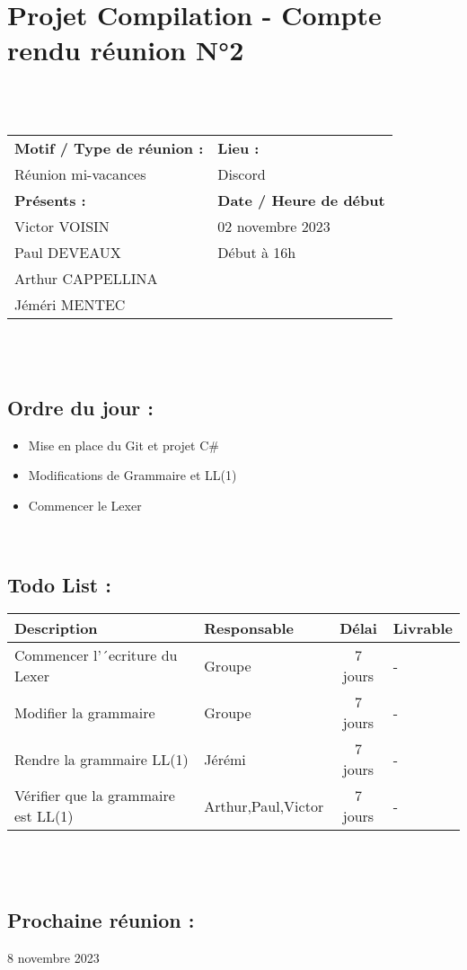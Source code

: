 \documentclass{article}
\begin{document}
\section*{Projet Compilation - Compte rendu réunion N°2}
~\\\\
\begin{tabular}{|p{7cm}|p{6cm}|}
    \hline
    \textbf{Motif / Type de réunion :}
    & \textbf{Lieu :}
    \\
    Réunion mi-vacances
    &
    Discord
    \\ \hline
    \textbf{Présents :}
    &
    \textbf{Date / Heure de début}
    \\
    Victor VOISIN &  02 novembre 2023\\
    Paul DEVEAUX & Début à 16h\\
    Arthur CAPPELLINA & \\
    Jéméri MENTEC &
    \\ \hline
\end{tabular}
\\\\

\subsection*{Ordre du jour :}
\begin{itemize}
    \item{Mise en place du Git et projet C\#}
    \item{Modifications de Grammaire et LL(1)}
    \item{Commencer le Lexer}
\end{itemize}
~

\subsection*{Todo List :}
\renewcommand{\arraystretch}{1.5}
\begin{tabular}{|p{5cm}|l|c|p{4.5cm}|}
    \hline
    Description & Responsable & Délai & Livrable\\ 
    \hline
    Commencer l’´ecriture du Lexer & Groupe  & 7 jours & - \\
    Modifier la grammaire & Groupe  & 7 jours & -\\
    Rendre la grammaire LL(1) & Jérémi  & 7 jours & -\\
    Vérifier que la grammaire est LL(1) & Arthur,Paul,Victor  & 7 jours & -\\
    \hline
\end{tabular}
\\\\

\subsection*{Prochaine réunion :} 8 novembre 2023
\end{document}
